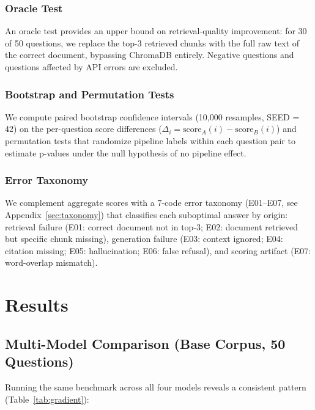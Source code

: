 \documentclass{article}
\begin{document}
\subsubsection{Oracle Test}

An oracle test provides an upper bound on retrieval-quality improvement: for 30 of 50 questions, we replace the top-3 retrieved chunks with the full raw text of the correct document, bypassing ChromaDB entirely. Negative questions and questions affected by API errors are excluded.

\subsubsection{Bootstrap and Permutation Tests}

We compute paired bootstrap confidence intervals (10,000 resamples, SEED = 42) on the per-question score differences ($\Delta_i = \text{score}_A(i) - \text{score}_B(i)$) and permutation tests that randomize pipeline labels within each question pair to estimate p-values under the null hypothesis of no pipeline effect.

\subsubsection{Error Taxonomy}

We complement aggregate scores with a 7-code error taxonomy (E01--E07, see Appendix~\ref{sec:taxonomy}) that classifies each suboptimal answer by origin: retrieval failure (E01: correct document not in top-3; E02: document retrieved but specific chunk missing), generation failure (E03: context ignored; E04: citation missing; E05: hallucination; E06: false refusal), and scoring artifact (E07: word-overlap mismatch).

\section{Results}

\subsection{Multi-Model Comparison (Base Corpus, 50 Questions)}

Running the same benchmark across all four models reveals a consistent pattern (Table~\ref{tab:gradient}):
\end{document}

